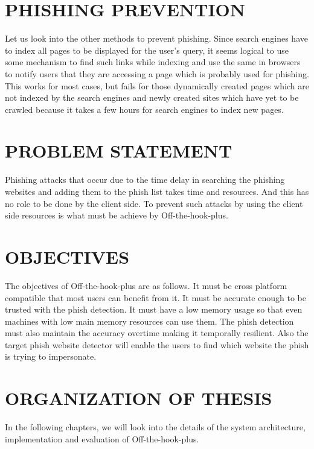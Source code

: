 \section{PHISHING PREVENTION}
Let us look into the other methods to prevent phishing. Since search engines have to index all pages to be displayed for the user’s query, it seems logical to use some mechanism to find such links while indexing and use the same in browsers to notify users that they are accessing a page which is probably used for phishing. This works for most cases, but fails for those dynamically created pages which are not indexed by the search engines and newly created sites which have yet to be crawled because it takes a few hours for search engines to index new pages. 

\section{PROBLEM STATEMENT}
Phishing attacks that occur due to the time delay in searching the phishing websites and adding them to the phish list takes time and resources. And this has no role to be done by the client side. To prevent such attacks by using the client side resources is what must be achieve by Off-the-hook-plus.

\section{OBJECTIVES}
The objectives of Off-the-hook-plus are as follows. It must be cross platform compatible that most users can benefit from it. It must be accurate enough to be trusted with the phish detection. It must have a low memory usage so that even machines with low main memory resources can use them. The phish detection must also maintain the accuracy overtime making it temporally resilient. Also the target phish website detector will enable the users to find which website the phish is trying to impersonate.

\section{ORGANIZATION OF THESIS}
In the following chapters, we will look into the details of the system architecture, implementation and evaluation of Off-the-hook-plus.

